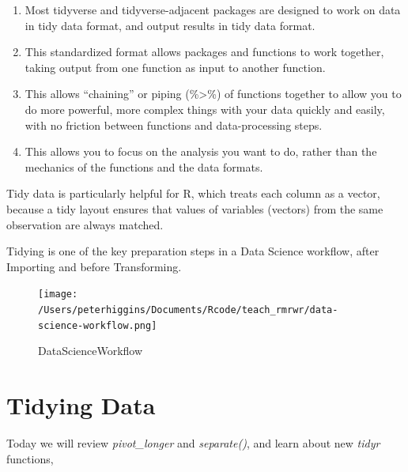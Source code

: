\documentclass[
]{book}
\providecommand{\tightlist}{%
  \setlength{\itemsep}{0pt}\setlength{\parskip}{0pt}}
\begin{document}
\begin{enumerate}
\def\labelenumi{\arabic{enumi}.}
\tightlist
\item
  Most tidyverse and tidyverse-adjacent packages are designed to work on data in tidy data format, and output results in tidy data format.
\item
  This standardized format allows packages and functions to work together, taking output from one function as input to another function.
\item
  This allows ``chaining'' or piping (\%\textgreater\%) of functions together to allow you to do more powerful, more complex things with your data quickly and easily, with no friction between functions and data-processing steps.
\item
  This allows you to focus on the analysis you want to do, rather than the mechanics of the functions and the data formats.
\end{enumerate}

Tidy data is particularly helpful for R, which treats each column as a vector, because a tidy layout ensures that values of variables (vectors) from the same observation are always matched.

Tidying is one of the key preparation steps in a Data Science workflow, after Importing and before Transforming.

\begin{figure}
\centering
\texttt{[image: /Users/peterhiggins/Documents/Rcode/teach\_rmrwr/data-science-workflow.png]}
\caption{DataScienceWorkflow}
\end{figure}

\hypertarget{tidying-data-1}{%
\section{Tidying Data}\label{tidying-data-1}}

Today we will review \emph{pivot\_longer} and \emph{separate()}, and
learn about new \emph{tidyr} functions,
\end{document}

